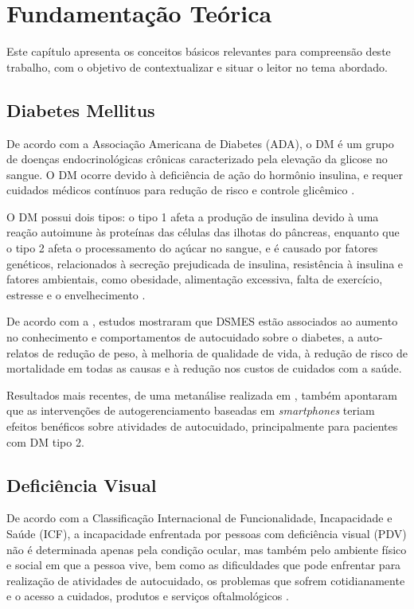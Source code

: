 \chapter{Fundamentação Teórica}
\label{ch:fundament}

Este capítulo apresenta os conceitos básicos relevantes para compreensão deste trabalho,
com o objetivo de contextualizar e situar o leitor no tema abordado.

\section{Diabetes Mellitus}

De acordo com a Associação Americana de Diabetes (ADA), o DM é um grupo de doenças endocrinológicas crônicas
caracterizado pela elevação da glicose no sangue. O DM ocorre devido à deficiência de ação do hormônio insulina, e requer cuidados médicos
contínuos para redução de risco e controle glicêmico \cite{ADA2019}.

O DM possui dois tipos: o tipo 1 afeta a produção de insulina devido à uma reação autoimune às proteínas das células das ilhotas do pâncreas,
enquanto que o tipo 2 afeta o processamento do açúcar no sangue, e é causado por fatores genéticos, relacionados à secreção prejudicada de insulina,
resistência à insulina e fatores ambientais, como obesidade, alimentação excessiva, falta de exercício, estresse e o envelhecimento \cite{Ozougwu_2013}.

De acordo com a , estudos mostraram que DSMES estão associados ao aumento no conhecimento e comportamentos de
autocuidado sobre o diabetes, a auto-relatos de redução de peso, à melhoria de qualidade de vida, à redução de risco de mortalidade
em todas as causas e à redução nos custos de cuidados com a saúde.

Resultados mais recentes, de uma metanálise realizada em , também apontaram que as intervenções
de autogerenciamento baseadas em \emph{smartphones} teriam efeitos benéficos sobre atividades de autocuidado, principalmente para
pacientes com DM tipo 2.

\section{Deficiência Visual}

De acordo com a Classificação Internacional de Funcionalidade, Incapacidade e Saúde (ICF),
a incapacidade enfrentada por pessoas com deficiência visual (PDV) não é determinada apenas
pela condição ocular, mas também pelo ambiente físico e social em que a pessoa vive, bem como
as dificuldades que pode enfrentar para realização de atividades de autocuidado, os problemas
que sofrem cotidianamente e o acesso a cuidados, produtos e serviços oftalmológicos \cite{WHO2019}.

